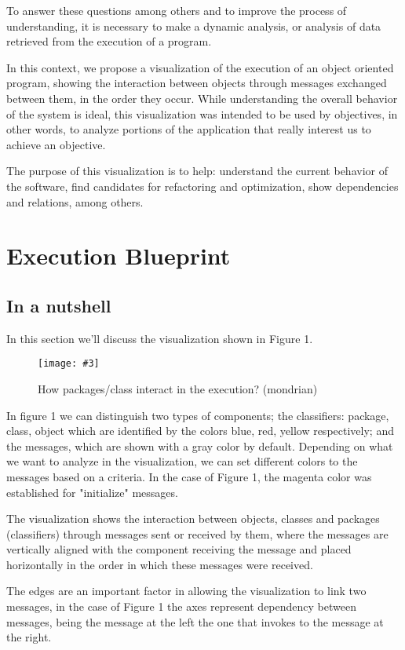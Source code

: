 \documentclass{sig-alternate}
\newcommand{\largefig}[4]{
	\begin{figure*}[#1]
		\centering
		\texttt{[image: \#3]}
		\caption{\label{fig:#3}#4}
	\end{figure*}}
\newcommand{\seclabel}[1]{\label{sec:#1}}
\begin{document}
To answer these questions among others and to improve the process of understanding, it is necessary to make a dynamic analysis, or analysis of data retrieved from the execution of a program.

In this context, we propose a visualization of the execution of an object oriented program, showing the interaction between objects through messages exchanged between them, in the order they occur. While understanding the overall behavior of the system is ideal, this visualization was intended to be used by objectives, in other words, to analyze portions of the application that really interest us to achieve an objective.

The purpose of this visualization is to help: understand the current behavior of the software, find candidates for refactoring and optimization, show dependencies and relations, among others.

\section{Execution Blueprint}\seclabel{executionBlueprint}

\subsection{In a nutshell}

In this section we'll discuss the visualization shown in Figure 1.

\largefig{}{1.0}{MondrianDependence}{How packages/class interact in the execution? (mondrian)}


In figure 1 we can distinguish two types of components; the classifiers: package, class, object which are identified by the colors blue, red, yellow  respectively; and the messages, which are shown with a gray color by default. Depending on what we want to analyze in the visualization, we can set different colors to the messages based on a criteria. In the case of Figure 1, the magenta color was established for "initialize" messages.

The visualization shows the interaction between objects, classes and packages (classifiers) through messages sent or received by them, where the messages are vertically aligned with the component receiving the message and placed horizontally in the order in which these messages were received.

The edges are an important factor in allowing the visualization to link two messages, in the case of Figure 1 the axes represent dependency between messages, being the message at the left the one that invokes to the message at the right.
\end{document}
